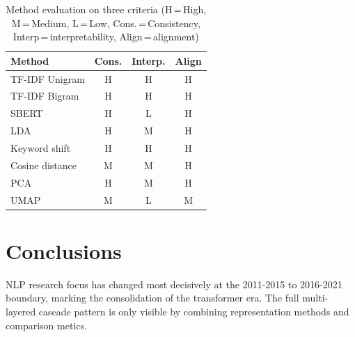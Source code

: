 \begin{table}[t]
  \centering\small
  \begin{tabular}{lccc}
    \hline
    \textbf{Method} & \textbf{Cons.} & \textbf{Interp.}
                    & \textbf{Align} \\
    \hline
    TF-IDF Unigram  & H & H & H \\
    TF-IDF Bigram   & H & H & H \\
    SBERT           & H & L & H \\
    LDA             & H & M & H \\
    Keyword shift   & H & H & H \\
    Cosine distance & M & M & H \\
    PCA             & H & M & H \\
    UMAP            & M & L & M \\
    \hline
  \end{tabular}
  \caption{Method evaluation on three criteria (H\,=\,High,
    M\,=\,Medium, L\,=\,Low, Cons.\,=\,Consistency, Interp\,=\,interpretability, Align\,=\,alignment)}
  \label{tab:eval}
\end{table}



\section{Conclusions}
\label{sec:conclusions}



NLP research focus has changed most decisively at the 2011-2015 to 2016-2021 boundary, marking the consolidation of the transformer era. The full multi-layered cascade pattern is only visible by combining representation methods and comparison metics.



